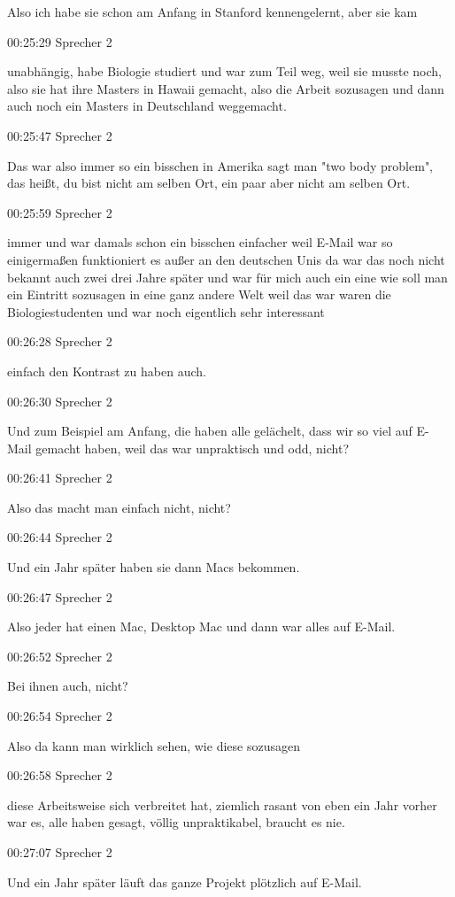 Also ich habe sie schon am Anfang in Stanford kennengelernt, aber sie
kam

00:25:29 Sprecher 2

unabhängig, habe Biologie studiert und war zum Teil weg, weil sie musste
noch, also sie hat ihre Masters in Hawaii gemacht, also die Arbeit
sozusagen und dann auch noch ein Masters in Deutschland weggemacht.

00:25:47 Sprecher 2

Das war also immer so ein bisschen in Amerika sagt man "two body
problem", das heißt, du bist nicht am selben Ort, ein paar aber nicht am
selben Ort.

00:25:59 Sprecher 2

immer und war damals schon ein bisschen einfacher weil E-Mail war so
einigermaßen funktioniert es außer an den deutschen Unis da war das noch
nicht bekannt auch zwei drei Jahre später und war für mich auch ein eine
wie soll man ein Eintritt sozusagen in eine ganz andere Welt weil das
war waren die Biologiestudenten und war noch eigentlich sehr interessant

00:26:28 Sprecher 2

einfach den Kontrast zu haben auch.

00:26:30 Sprecher 2

Und zum Beispiel am Anfang, die haben alle gelächelt, dass wir so viel
auf E-Mail gemacht haben, weil das war unpraktisch und odd, nicht?

00:26:41 Sprecher 2

Also das macht man einfach nicht, nicht?

00:26:44 Sprecher 2

Und ein Jahr später haben sie dann Macs bekommen.

00:26:47 Sprecher 2

Also jeder hat einen Mac, Desktop Mac und dann war alles auf E-Mail.

00:26:52 Sprecher 2

Bei ihnen auch, nicht?

00:26:54 Sprecher 2

Also da kann man wirklich sehen, wie diese sozusagen

00:26:58 Sprecher 2

diese Arbeitsweise sich verbreitet hat, ziemlich rasant von eben ein
Jahr vorher war es, alle haben gesagt, völlig unpraktikabel, braucht es
nie.

00:27:07 Sprecher 2

Und ein Jahr später läuft das ganze Projekt plötzlich auf E-Mail.


